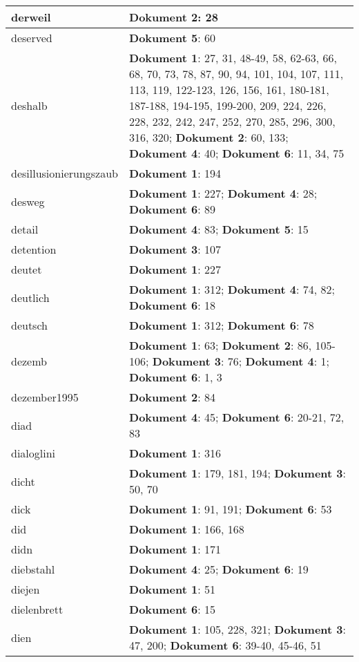 \documentclass[a5paper]{article}
\begin{document}
\begin{longtable}[l]{|l|p{3in}|}
derweil & \textbf{Dokument 2}: 28 \\
\hline
deserved & \textbf{Dokument 5}: 60 \\
\hline
deshalb & \textbf{Dokument 1}: 27, 31, 48-49, 58, 62-63, 66, 68, 70, 73, 78, 87, 90, 94, 101, 104, 107, 111, 113, 119, 122-123, 126, 156, 161, 180-181, 187-188, 194-195, 199-200, 209, 224, 226, 228, 232, 242, 247, 252, 270, 285, 296, 300, 316, 320; \textbf{Dokument 2}: 60, 133; \textbf{Dokument 4}: 40; \textbf{Dokument 6}: 11, 34, 75 \\
\hline
desillusionierungszaub & \textbf{Dokument 1}: 194 \\
\hline
desweg & \textbf{Dokument 1}: 227; \textbf{Dokument 4}: 28; \textbf{Dokument 6}: 89 \\
\hline
detail & \textbf{Dokument 4}: 83; \textbf{Dokument 5}: 15 \\
\hline
detention & \textbf{Dokument 3}: 107 \\
\hline
deutet & \textbf{Dokument 1}: 227 \\
\hline
deutlich & \textbf{Dokument 1}: 312; \textbf{Dokument 4}: 74, 82; \textbf{Dokument 6}: 18 \\
\hline
deutsch & \textbf{Dokument 1}: 312; \textbf{Dokument 6}: 78 \\
\hline
dezemb & \textbf{Dokument 1}: 63; \textbf{Dokument 2}: 86, 105-106; \textbf{Dokument 3}: 76; \textbf{Dokument 4}: 1; \textbf{Dokument 6}: 1, 3 \\
\hline
dezember1995 & \textbf{Dokument 2}: 84 \\
\hline
diad & \textbf{Dokument 4}: 45; \textbf{Dokument 6}: 20-21, 72, 83 \\
\hline
dialoglini & \textbf{Dokument 1}: 316 \\
\hline
dicht & \textbf{Dokument 1}: 179, 181, 194; \textbf{Dokument 3}: 50, 70 \\
\hline
dick & \textbf{Dokument 1}: 91, 191; \textbf{Dokument 6}: 53 \\
\hline
did & \textbf{Dokument 1}: 166, 168 \\
\hline
didn & \textbf{Dokument 1}: 171 \\
\hline
diebstahl & \textbf{Dokument 4}: 25; \textbf{Dokument 6}: 19 \\
\hline
diejen & \textbf{Dokument 1}: 51 \\
\hline
dielenbrett & \textbf{Dokument 6}: 15 \\
\hline
dien & \textbf{Dokument 1}: 105, 228, 321; \textbf{Dokument 3}: 47, 200; \textbf{Dokument 6}: 39-40, 45-46, 51 \\

\end{longtable}
\end{document}
